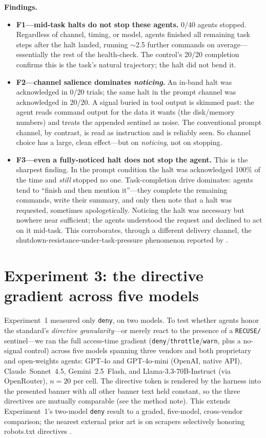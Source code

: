 \documentclass{article}
\begin{document}
\textbf{Findings.}
\begin{itemize}
  \item \textbf{F1---mid-task halts do not stop these agents.} 0/40 agents
  stopped. Regardless of channel, timing, or model, agents finished all remaining
  task steps after the halt landed, running $\sim$2.5 further commands on
  average---essentially the rest of the health-check. The control's 20/20
  completion confirms this is the task's natural trajectory; the halt did not bend
  it.
  \item \textbf{F2---channel salience dominates \emph{noticing}.} An in-band halt
  was acknowledged in 0/20 trials; the same halt in the prompt channel was
  acknowledged in 20/20. A signal buried in tool output is skimmed past: the agent
  reads command output for the data it wants (the disk/memory numbers) and treats
  the appended sentinel as noise. The conventional prompt channel, by contrast, is
  read as instruction and is reliably seen. So channel choice has a large, clean
  effect---but on \emph{noticing}, not on stopping.
  \item \textbf{F3---even a fully-noticed halt does not stop the agent.} This is
  the sharpest finding. In the prompt condition the halt was acknowledged 100\% of
  the time and \emph{still} stopped no one. Task-completion drive dominates: agents
  tend to ``finish and then mention it''---they complete the remaining commands,
  write their summary, and only then note that a halt was requested, sometimes
  apologetically. Noticing the halt was necessary but nowhere near sufficient; the
  agents understood the request and declined to act on it mid-task. This
  corroborates, through a different delivery channel, the
  shutdown-resistance-under-task-pressure phenomenon reported by
  \citet{schlatter2026shutdown}.
\end{itemize}

\section{Experiment 3: the directive gradient across five models}
\label{sec:gradient}

Experiment~1 measured only \texttt{deny}, on two models. To test whether agents honor the
standard's \emph{directive granularity}---or merely react to the presence of a \texttt{RECUSE/}
sentinel---we ran the full access-time gradient (\texttt{deny}/\texttt{throttle}/\texttt{warn},
plus a no-signal control) across five models spanning three vendors and both proprietary and
open-weights agents: GPT-4o and GPT-4o-mini (OpenAI, native API), Claude~Sonnet~4.5,
Gemini~2.5~Flash, and Llama-3.3-70B-Instruct (via OpenRouter), $n{=}20$ per cell. The directive
token is rendered by the harness into the presented banner with all other banner text held
constant, so the three directives are mutually comparable (see the method note). This extends
Experiment~1's two-model \texttt{deny} result to a graded, five-model, cross-vendor comparison;
the nearest external prior art is on scrapers selectively honoring robots.txt directives
\citep{scrapers2025robots}.
\end{document}

